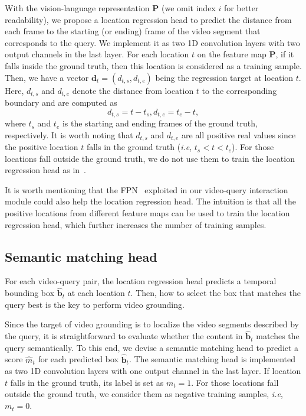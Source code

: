\documentclass[10pt,twocolumn,letterpaper]{article}
\def\ie{\emph{i.e}\onedot} \def\Ie{\emph{I.e}\onedot}
\def\Vec#1{{\boldsymbol{#1}}}
\begin{document}
	With the vision-language representation $\mathbf{P}$ (we omit  index $i$ for better readability), we propose a location regression head to predict the distance from each frame to the starting (or ending) frame of the video segment that corresponds to the query.
	We implement it as two 1D convolution layers with two output channels in the last layer. 
	For each location $t$ on the feature map $\mathbf{P}$, if it falls inside the ground truth, then this location is considered as a training sample. Then, we have a vector $\Vec{d}_t=(d_{t,s}, d_{t,e})$ being the regression target at location $t$. Here, $d_{t,s}$ and $d_{t,e}$ denote the distance from location $t$ to the corresponding boundary and are computed as 
	\begin{equation}\label{eq:regression_target}
	d_{t,s} = t - t_s, d_{t,e} = t_e - t,
	\end{equation}
	where $t_s$ and $t_e$ is the starting and ending frames of the ground truth, respectively. 
	It is worth noting that $d_{t,s}$ and $d_{t,e}$ are all positive real values since the positive location $t$ falls in the ground truth (\ie, $t_s < t < t_e$). For those locations fall outside the ground truth, we do not use them to train the location regression head as in~\cite{tian2019fcos}. 
	
	It is worth mentioning that the FPN~\cite{lin2017feature} exploited in our video-query interaction module could also help the location regression head.
	The intuition is that all the positive locations from different feature maps can be used to train the location regression head, which further increases the number of training samples.
	
	
	\subsection{Semantic matching head}
	\label{sec:matching-head}
	
	For each video-query pair, the location regression head predicts a temporal bounding box $\hat{\mathbf{b}}_{t}$ at each location $t$. Then, how to select the box that matches the query best is the key to perform video grounding.
	
	Since the target of video grounding is to localize the video segments described by the query, it is straightforward to evaluate whether the content in $\hat{\mathbf{b}}_{t}$ matches the query semantically.
	To this end, we devise a semantic matching head to predict a score $\hat{m}_t$ for each predicted box $\hat{\mathbf{b}}_{t}$.
	The semantic matching head is implemented as two 1D convolution layers with one output channel in the last layer. 
	If location $t$ falls in the ground truth, its label is set as $m_t=1$.
	For those locations fall outside the ground truth, we consider them as negative training samples, \ie, $m_t=0$. 
	
\end{document}
